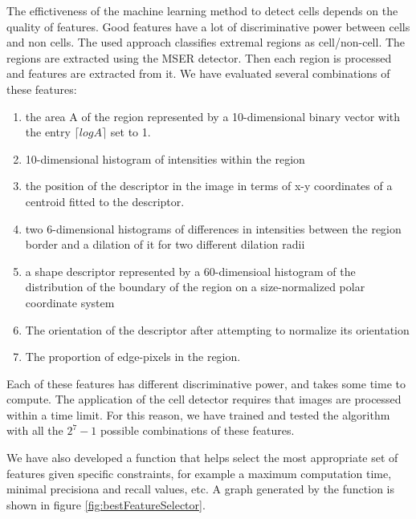 	The effictiveness of the machine learning method to detect cells depends on the quality of features. Good features have a lot of discriminative power between cells and non cells. The used approach classifies extremal regions as cell/non-cell. The regions are extracted using the MSER detector. Then each region is processed and features are extracted from it. We have evaluated several combinations of these features:
	
	\begin{enumerate}
	    \item the area A of the region represented by a 10-dimensional binary vector with the entry $\lceil log A \rceil $ set to 1.
		\item 10-dimensional histogram of intensities within the region
	    \item the position of the descriptor in the image in terms of x-y coordinates of a centroid fitted to the descriptor.
	    \item two 6-dimensional histograms of differences in intensities between the region border and a dilation of it for two different dilation radii
	    \item a shape descriptor represented by a 60-dimensioal histogram of the distribution of the boundary of the region on a size-normalized polar coordinate system
	    \item The orientation of the descriptor after attempting to normalize its orientation
	    \item The proportion of edge-pixels in the region.
	\end{enumerate}
	
	Each of these features has different discriminative power, and takes some time to compute. The application of the cell detector requires that images are processed within a time limit. For this reason, we have trained and tested the algorithm with all the $2^7 - 1$ possible combinations of these features.
	
	We have also developed a function that helps select the most appropriate set of features given specific constraints, for example a maximum computation time, minimal precisiona and recall values, etc. A graph generated by the function is shown in figure \ref{fig:bestFeatureSelector}.
	
